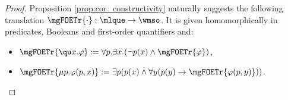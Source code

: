 \begin{proof}
%

Proposition \ref{prop:cor_constructivity} naturally suggests the following translation $\mgFOETr{\cdot}:\mlque\to\wmso$. It is given homomorphically in predicates, Booleans and first-order quantifiers and:
\begin{itemize}
 pt
\item $\mgFOETr{ \qu x. \varphi} := \forall p.\exists x. (\lnot p(x) \land \mgFOETr{\varphi})$,
\item $\mgFOETr{\mu p. \varphi(p,x)} := \exists p ( p(x) \land \forall y ( p(y) \to \mgFOETr{\varphi(p,y) }))$.
\end{itemize}




\end{proof}
